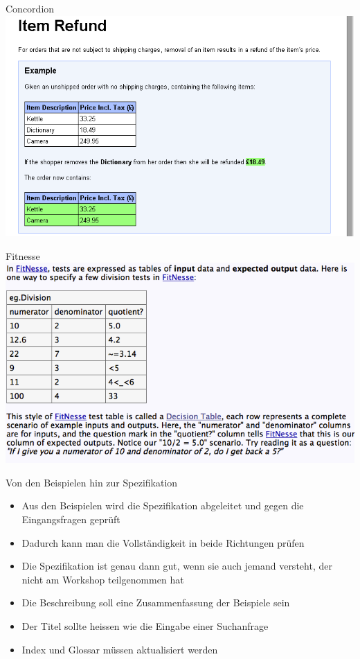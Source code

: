 \begin{frame}{Concordion}
\includegraphics[width=\textwidth]{Concordion.png} \newline
\end{frame}


\begin{frame}{Fitnesse}
\includegraphics[width=\textwidth]{Fitnesse.png} \newline
\end{frame}



\begin{frame}{Von den Beispielen hin zur Spezifikation}

\begin{itemize}
	\item Aus den Beispielen wird die Spezifikation abgeleitet und gegen die Eingangsfragen geprüft
	\item Dadurch kann man die Vollständigkeit in beide Richtungen prüfen
	\item Die Spezifikation ist genau dann gut, wenn sie auch jemand versteht, der nicht am Workshop teilgenommen hat
	\item Die Beschreibung soll eine Zusammenfassung der Beispiele sein
	\item Der Titel sollte heissen wie die Eingabe einer Suchanfrage
	\item Index und Glossar müssen aktualisiert werden
\end{itemize}

\end{frame}
 
